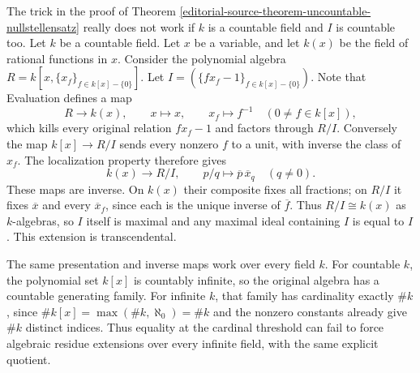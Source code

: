 \begin{example}
\label{editorial-source-example-countable-trick-does-not-work}
The trick in the proof of
Theorem \ref{editorial-source-theorem-uncountable-nullstellensatz}
really does not work if $k$ is a countable field and $I$ is countable too.
Let $k$ be a countable field. Let $x$ be a variable,
and let $k(x)$ be the field of rational functions in $x$.
Consider the polynomial algebra $R = k[x, \{x_f\}_{f \in k[x]-\{0\}}]$.
Let $I = (\{fx_f - 1\}_{f\in k[x] - \{0\}})$. Note that
Evaluation defines a map
$$
R\longrightarrow k(x),\qquad x\longmapsto x,\qquad
x_f\longmapsto f^{-1}\quad(0\ne f\in k[x]),
$$
which kills every original relation $fx_f-1$ and factors through
$R/I$. Conversely the map $k[x]\to R/I$ sends every nonzero
$f$ to a unit, with inverse the class of $x_f$. The localization
property therefore gives
$$
k(x)\longrightarrow R/I,\qquad p/q\longmapsto
\overline p\,\overline{x}_q\quad(q\ne0).
$$
These maps are inverse. On $k(x)$ their composite fixes all fractions;
on $R/I$ it fixes $\overline x$ and every $\overline{x}_f$, since
each is the unique inverse of $\overline f$. Thus $R/I\cong k(x)$
as $k$-algebras, so $I$ itself is maximal and any maximal ideal
containing $I$ is equal to $I$. This extension is transcendental.

The same presentation and inverse maps work over every field $k$.
For countable $k$, the polynomial set $k[x]$ is countably infinite,
so the original algebra has a countable generating family.
For infinite $k$, that family has cardinality exactly $\#k$, since
$\#k[x]=\max(\#k,\aleph_0)=\#k$ and the nonzero constants already
give $\#k$ distinct indices. Thus equality at the cardinal threshold
can fail to force algebraic residue extensions over every infinite
field, with the same explicit quotient.
\end{example}